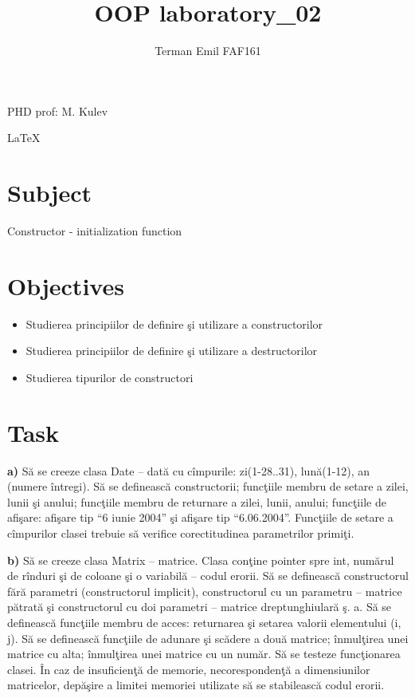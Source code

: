 \documentclass{article}
\begin{document}
	\newcommand{\cppInLine}[1]{
		{\lstinline[basicstyle=\small]|#1|}
	}

	\title{OOP laboratory\_02}
	\author{Terman Emil FAF161}
	\maketitle

	\vspace*{\fill}
	
	\begin{flushright}
		PHD prof: M. Kulev
	\end{flushright}

	\begin{center}
		\LaTeX
	\end{center}

	\pagebreak

	\section{Subject}
		Constructor - initialization function
	\section{Objectives}
		\begin{itemize}
			\item Studierea principiilor de definire şi utilizare a constructorilor

			\item Studierea principiilor de def­­­inire şi utilizare a destructorilor
			
			\item Studierea tipurilor de constructori
		\end{itemize}

	\section{Task}
		\textbf{a)} Să se creeze clasa Date – dată cu cîmpurile: zi(1-28..31), lună(1-12), an (numere întregi). Să se definească constructorii; funcţiile membru de setare a zilei, lunii şi anului; funcţiile membru de returnare a zilei, lunii, anului; funcţiile de afişare: afişare tip \enquote{6 iunie 2004} şi afişare tip \enquote{6.06.2004}. Funcţiile de setare a cîmpurilor clasei trebuie să verifice corectitudinea parametrilor primiţi.

		\textbf{b)} Să se creeze clasa Matrix – matrice. Clasa conţine pointer spre int, numărul de rînduri şi de coloane şi o variabilă – codul erorii. Să se definească constructorul fără parametri (constructorul implicit), constructorul cu un parametru – matrice pătrată şi constructorul cu doi parametri – matrice dreptunghiulară ş. a. Să se definească funcţiile membru de acces: returnarea şi setarea valorii elementului (i, j). Să se definească funcţiile de adunare şi scădere a două matrice; înmulţirea unei matrice cu alta; înmulţirea unei matrice cu un număr. Să se testeze funcţionarea clasei. În caz de insuficienţă de memorie, necorespondenţă a dimensiunilor matricelor, depăşire a limitei memoriei utilizate să se stabilească codul erorii. 
\end{document}
